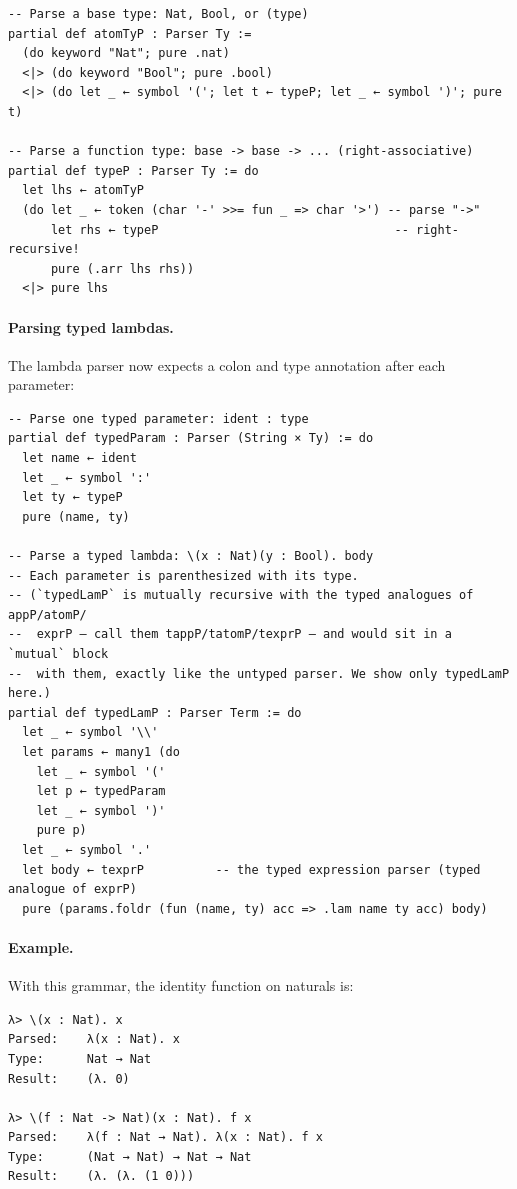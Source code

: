 \documentclass[11pt,a4paper]{article}
\theoremstyle{definition}
\begin{document}
\begin{verbatim}
-- Parse a base type: Nat, Bool, or (type)
partial def atomTyP : Parser Ty :=
  (do keyword "Nat"; pure .nat)
  <|> (do keyword "Bool"; pure .bool)
  <|> (do let _ ← symbol '('; let t ← typeP; let _ ← symbol ')'; pure t)

-- Parse a function type: base -> base -> ... (right-associative)
partial def typeP : Parser Ty := do
  let lhs ← atomTyP
  (do let _ ← token (char '-' >>= fun _ => char '>') -- parse "->"
      let rhs ← typeP                                 -- right-recursive!
      pure (.arr lhs rhs))
  <|> pure lhs
\end{verbatim}

\paragraph{Parsing typed lambdas.}
The lambda parser now expects a colon and type annotation after each parameter:

\begin{verbatim}
-- Parse one typed parameter: ident : type
partial def typedParam : Parser (String × Ty) := do
  let name ← ident
  let _ ← symbol ':'
  let ty ← typeP
  pure (name, ty)

-- Parse a typed lambda: \(x : Nat)(y : Bool). body
-- Each parameter is parenthesized with its type.
-- (`typedLamP` is mutually recursive with the typed analogues of appP/atomP/
--  exprP — call them tappP/tatomP/texprP — and would sit in a `mutual` block
--  with them, exactly like the untyped parser. We show only typedLamP here.)
partial def typedLamP : Parser Term := do
  let _ ← symbol '\\'
  let params ← many1 (do
    let _ ← symbol '('
    let p ← typedParam
    let _ ← symbol ')'
    pure p)
  let _ ← symbol '.'
  let body ← texprP          -- the typed expression parser (typed analogue of exprP)
  pure (params.foldr (fun (name, ty) acc => .lam name ty acc) body)
\end{verbatim}

\paragraph{Example.}
With this grammar, the identity function on naturals is:

\begin{verbatim}
λ> \(x : Nat). x
Parsed:    λ(x : Nat). x
Type:      Nat → Nat
Result:    (λ. 0)

λ> \(f : Nat -> Nat)(x : Nat). f x
Parsed:    λ(f : Nat → Nat). λ(x : Nat). f x
Type:      (Nat → Nat) → Nat → Nat
Result:    (λ. (λ. (1 0)))
\end{verbatim}
\end{document}
